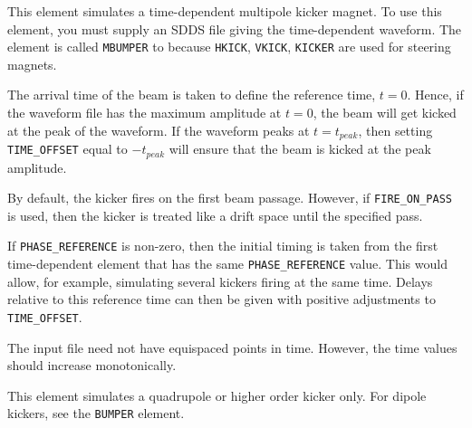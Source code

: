 This element simulates a time-dependent multipole kicker magnet.  To
use this element, you must supply an SDDS file giving the
time-dependent waveform.  The element is called {\tt MBUMPER} to
because {\tt HKICK}, {\tt VKICK}, {\tt KICKER} are used for steering
magnets.

The arrival time of the beam is taken to define the reference time,
$t=0$.  Hence, if the waveform file has the maximum amplitude at
$t=0$, the beam will get kicked at the peak of the waveform.  If the waveform
peaks at $t=t_{peak}$, then setting {\tt TIME_OFFSET} equal to $-t_{peak}$
will ensure that the beam is kicked at the peak amplitude.

By default, the kicker fires on the first beam passage.  However, if 
{\tt FIRE_ON_PASS} is used, then the kicker is treated like a drift space until
the specified pass.

If \verb|PHASE_REFERENCE| is non-zero, then the initial timing is
taken from the first time-dependent element that has the same
\verb|PHASE_REFERENCE| value.  This would allow, for example,
simulating several kickers firing at the same time.  Delays relative
to this reference time can then be given with positive adjustments to
{\tt TIME_OFFSET}.

The input file need not have equispaced points in time.  However, the
time values should increase monotonically.

This element simulates a quadrupole or higher order kicker
only.  For dipole kickers, see the {\tt BUMPER} element.
